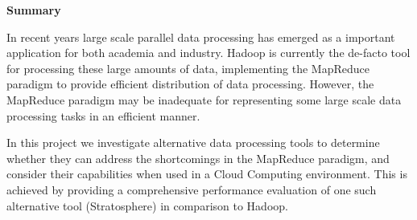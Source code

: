 \begin{center}
    {\LARGE\bf Summary}
\end{center}

In recent years large scale parallel data processing has emerged as a important application for both academia and industry. Hadoop is currently the de-facto tool for processing these large amounts of data, implementing the MapReduce paradigm to provide efficient distribution of data processing. However, the MapReduce paradigm may be inadequate for representing some large scale data processing tasks in an efficient manner.

In this project we investigate alternative data processing tools to determine whether they can address the shortcomings in the MapReduce paradigm, and consider their capabilities when used in a Cloud Computing environment. This is achieved by providing a comprehensive performance evaluation of one such alternative tool (Stratosphere) in comparison to Hadoop.